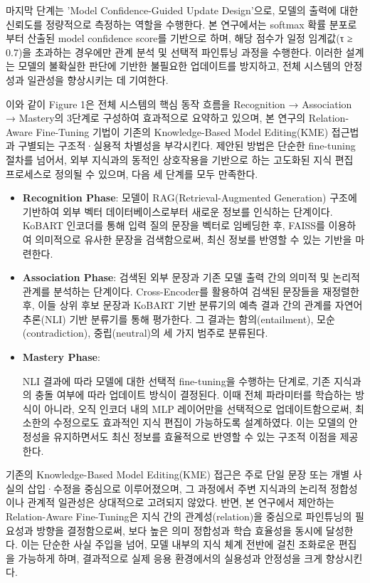 \documentclass[a4paper,fleqn]{cas-sc}
\begin{document}
마지막 단계는 'Model Confidence-Guided Update Design'으로, 모델의 출력에 대한 신뢰도를 정량적으로 측정하는 역할을 수행한다. 본 연구에서는 softmax 확률 분포로부터 산출된 model confidence score를 기반으로 하며, 해당 점수가 일정 임계값(τ ≥ 0.7)을 초과하는 경우에만 관계 분석 및 선택적 파인튜닝 과정을 수행한다. 이러한 설계는 모델의 불확실한 판단에 기반한 불필요한 업데이트를 방지하고, 전체 시스템의 안정성과 일관성을 향상시키는 데 기여한다.

이와 같이 Figure 1은 전체 시스템의 핵심 동작 흐름을 Recognition → Association → Mastery의 3단계로 구성하여 효과적으로 요약하고 있으며, 본 연구의 Relation-Aware Fine-Tuning 기법이 기존의 Knowledge-Based Model Editing(KME) 접근법과 구별되는 구조적·실용적 차별성을 부각시킨다. 제안된 방법은 단순한 fine-tuning 절차를 넘어서, 외부 지식과의 동적인 상호작용을 기반으로 하는 고도화된 지식 편집 프로세스로 정의될 수 있으며, 다음 세 단계를 모두 만족한다.

\begin{itemize}
    \item{\textbf{Recognition Phase}:
    모델이 RAG(Retrieval-Augmented Generation) 구조에 기반하여 외부 벡터 데이터베이스로부터 새로운 정보를 인식하는 단계이다. KoBART 인코더를 통해 입력 질의 문장을 벡터로 임베딩한 후, FAISS를 이용하여 의미적으로 유사한 문장을 검색함으로써, 최신 정보를 반영할 수 있는 기반을 마련한다.}
    
    \item{\textbf{Association Phase}:
    검색된 외부 문장과 기존 모델 출력 간의 의미적 및 논리적 관계를 분석하는 단계이다. Cross-Encoder를 활용하여 검색된 문장들을 재정렬한 후, 이들 상위 후보 문장과 KoBART 기반 분류기의 예측 결과 간의 관계를 자연어 추론(NLI) 기반 분류기를 통해 평가한다. 그 결과는 함의(entailment), 모순(contradiction), 중립(neutral)의 세 가지 범주로 분류된다.}
    
    \item{\textbf{Mastery Phase}:
    
    NLI 결과에 따라 모델에 대한 선택적 fine-tuning을 수행하는 단계로, 기존 지식과의 충돌 여부에 따라 업데이트 방식이 결정된다. 이때 전체 파라미터를 학습하는 방식이 아니라, 오직 인코더 내의 MLP 레이어만을 선택적으로 업데이트함으로써, 최소한의 수정으로도 효과적인 지식 편집이 가능하도록 설계하였다. 이는 모델의 안정성을 유지하면서도 최신 정보를 효율적으로 반영할 수 있는 구조적 이점을 제공한다.
    }

\end{itemize}  

기존의 Knowledge-Based Model Editing(KME) 접근은 주로 단일 문장 또는 개별 사실의 삽입·수정을 중심으로 이루어졌으며, 그 과정에서 주변 지식과의 논리적 정합성이나 관계적 일관성은 상대적으로 고려되지 않았다. 반면, 본 연구에서 제안하는 Relation-Aware Fine-Tuning은 지식 간의 관계성(relation)을 중심으로 파인튜닝의 필요성과 방향을 결정함으로써, 보다 높은 의미 정합성과 학습 효율성을 동시에 달성한다. 이는 단순한 사실 주입을 넘어, 모델 내부의 지식 체계 전반에 걸친 조화로운 편집을 가능하게 하며, 결과적으로 실제 응용 환경에서의 실용성과 안정성을 크게 향상시킨다.
\end{document}

